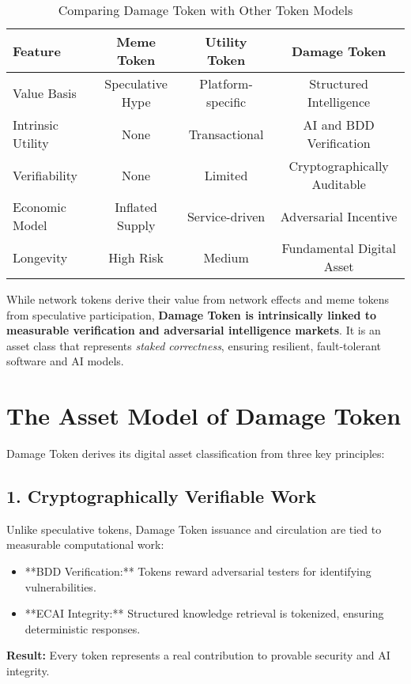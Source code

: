 \documentclass{article}
\begin{document}
\begin{table}[h]
\centering
\renewcommand{\arraystretch}{1.3}
\begin{tabular}{@{}lccc@{}}
\toprule
\textbf{Feature} & \textbf{Meme Token} & \textbf{Utility Token} & \textbf{Damage Token} \\
\midrule
Value Basis & Speculative Hype & Platform-specific & Structured Intelligence \\
Intrinsic Utility & None & Transactional & AI and BDD Verification \\
Verifiability & None & Limited & Cryptographically Auditable \\
Economic Model & Inflated Supply & Service-driven & Adversarial Incentive \\
Longevity & High Risk & Medium & Fundamental Digital Asset \\
\bottomrule
\end{tabular}
\caption{Comparing Damage Token with Other Token Models}
\label{tab:token_comparison}
\end{table}

While network tokens derive their value from network effects and meme tokens from speculative participation, \textbf{Damage Token is intrinsically linked to measurable verification and adversarial intelligence markets}. It is an asset class that represents \textit{staked correctness}, ensuring resilient, fault-tolerant software and AI models.

\section{The Asset Model of Damage Token}

Damage Token derives its digital asset classification from three key principles:

\subsection{1. Cryptographically Verifiable Work}
Unlike speculative tokens, Damage Token issuance and circulation are tied to measurable computational work:
\begin{itemize}
    \item **BDD Verification:** Tokens reward adversarial testers for identifying vulnerabilities.
    \item **ECAI Integrity:** Structured knowledge retrieval is tokenized, ensuring deterministic responses.
\end{itemize}
\textbf{Result:} Every token represents a real contribution to provable security and AI integrity.
\end{document}
